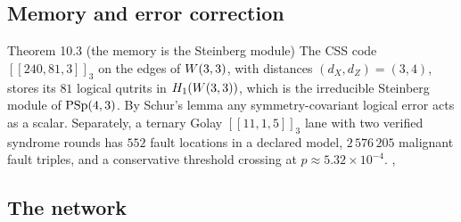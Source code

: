 \subsection{Memory and error correction}

\begin{result}{Theorem 10.3 (the memory is the Steinberg module) \hfill \tierC}
The CSS code $[[240,81,3]]_3$ on the edges of $W(3,3)$, with distances $(d_X,d_Z)=(3,4)$,
stores its $81$ logical qutrits in $H_1(W(3,3))$, which is the irreducible Steinberg module of
$\mathrm{PSp}(4,3)$. By Schur's lemma any symmetry-covariant logical error acts as a scalar.
Separately, a ternary Golay $[[11,1,5]]_3$ lane with two verified syndrome rounds has $552$
fault locations in a declared model, $2\,576\,205$ malignant fault triples, and a conservative
threshold crossing at $p\approx5.32\times10^{-4}$.
, 
\end{result}

\subsection{The network}

